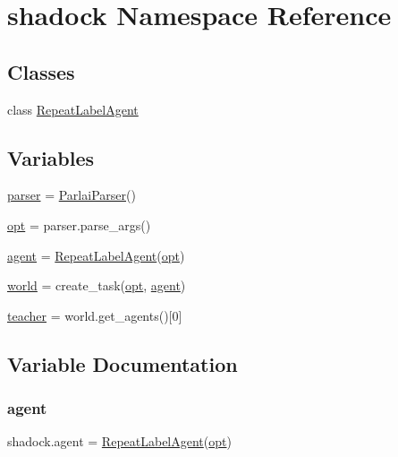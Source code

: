 \hypertarget{namespaceshadock}{}\section{shadock Namespace Reference}
\label{namespaceshadock}
\subsection*{Classes}
\begin{DoxyCompactItemize}
\item 
class \hyperlink{classshadock_1_1RepeatLabelAgent}{Repeat\+Label\+Agent}
\end{DoxyCompactItemize}
\subsection*{Variables}
\begin{DoxyCompactItemize}
\item 
\hyperlink{namespaceshadock_aa4e07d2eebb7832812fa751fcc89196b}{parser} = \hyperlink{classparlai_1_1core_1_1params_1_1ParlaiParser}{Parlai\+Parser}()
\item 
\hyperlink{namespaceshadock_a1f0720d3750ae2bb3fbbaad0fd0e33ae}{opt} = parser.\+parse\+\_\+args()
\item 
\hyperlink{namespaceshadock_ad75e4ea6fe08d47d4a18de24b6bc2455}{agent} = \hyperlink{classshadock_1_1RepeatLabelAgent}{Repeat\+Label\+Agent}(\hyperlink{namespaceshadock_a1f0720d3750ae2bb3fbbaad0fd0e33ae}{opt})
\item 
\hyperlink{namespaceshadock_a7a57065851adb01a5966c61a702b2748}{world} = create\+\_\+task(\hyperlink{namespaceshadock_a1f0720d3750ae2bb3fbbaad0fd0e33ae}{opt}, \hyperlink{namespaceshadock_ad75e4ea6fe08d47d4a18de24b6bc2455}{agent})
\item 
\hyperlink{namespaceshadock_abc8ed101017c61d6a944f70094e73277}{teacher} = world.\+get\+\_\+agents()\mbox{[}0\mbox{]}
\end{DoxyCompactItemize}


\subsection{Variable Documentation}
\mbox{\label{namespaceshadock_ad75e4ea6fe08d47d4a18de24b6bc2455}} 
\subsubsection{\texorpdfstring{agent}{agent}}
{\footnotesize\ttfamily shadock.\+agent = \hyperlink{classshadock_1_1RepeatLabelAgent}{Repeat\+Label\+Agent}(\hyperlink{namespaceshadock_a1f0720d3750ae2bb3fbbaad0fd0e33ae}{opt})}



